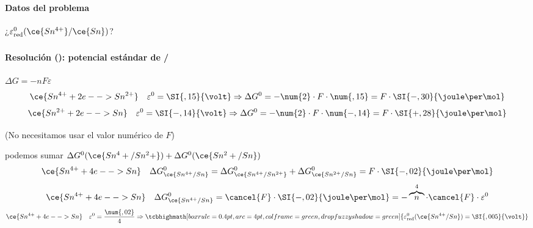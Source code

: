 
\begin{frame}
	\frametitle{\ejerciciocmd}
	\framesubtitle{Datos del problema}
	\begin{center}
		{\huge¿$\varepsilon^0_{\text{red}}(\ce{Sn^{4+}}/\ce{Sn})$?}\\[.3cm]
		\quad
	\end{center}
\end{frame}

\begin{frame}
	\frametitle{\ejerciciocmd}
	\framesubtitle{Resolución (): potencial estándar de /}
	\quad$\Delta G = -nF\varepsilon$
	$$
		\ce{Sn^{4+} + 2e- -> Sn^{2+}}\quad\varepsilon^0=\SI{,15}{\volt}\Rightarrow\Delta G^0=-\num{2}\cdot F\cdot\num{,15}=F\cdot\SI{-,30}{\joule\per\mol}
	$$
	$$
		\ce{Sn^{2+} + 2e- -> Sn}\quad\varepsilon^0=\SI{-,14}{\volt}\Rightarrow\Delta G^0=-\num{2}\cdot F\cdot\num{-,14}=F\cdot\SI{+,28}{\joule\per\mol}
	$$
	\begin{center}
		{\small (No necesitamos usar el valor numérico de $F$)}\\[.6cm]
	\end{center}
	 podemos sumar $\Delta G^0(\ce{Sn^4+/Sn^2+}) + \Delta G^0(\ce{Sn^2+/Sn})$
	$$
		\ce{Sn^{4+} + 4e- -> Sn}\quad\Delta G^0_{\ce{Sn^{4+}/Sn}}=\Delta G^0_{\ce{Sn^{4+}/Sn^{2+}}}+\Delta G^0_{\ce{Sn^{2+}/Sn}}=F\cdot\SI{-,02}{\joule\per\mol}
	$$
	$$
		\ce{Sn^{4+} + 4e- -> Sn}\quad\Delta G^0_{\ce{Sn^{4+}/Sn}}=\cancel{F}\cdot\SI{-,02}{\joule\per\mol}=-\overbrace{n}^4\cdot\cancel{F}\cdot\varepsilon^0
	$$
	$$
		\ce{Sn^{4+} + 4e- -> Sn}\quad\varepsilon^0=\frac{\num{,02}}{4}\Rightarrow\tcbhighmath[boxrule=0.4pt,arc=4pt,colframe=green,drop fuzzy shadow=green]{\varepsilon^0_{\text{red}}(\ce{Sn^{4+}/Sn})=\SI{,005}{\volt}}
	$$\\[.6cm]
	\begin{center}
		{\LARGE {}}
	\end{center}
\end{frame}
